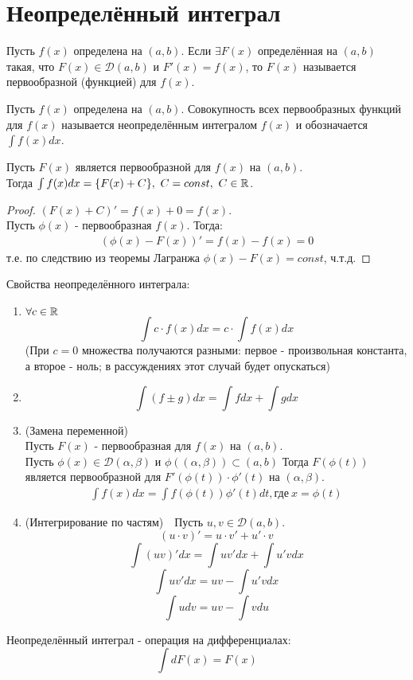 \section{Неопределённый интеграл}
\begin{definition}
    Пусть $f(x)$ определена на $(a, b)$. Если $\exists F(x)$ определённая на $(a, b)$ такая, что $F(x) \in \mathcal{D}(a, b)$ и $F'(x) = f(x)$, то $F(x)$ называется первообразной (функцией) для $f(x)$.
\end{definition}
\begin{definition}
    Пусть $f(x)$ определена на $(a, b)$. Совокупность всех первообразных функций для $f(x)$ называется неопределённым интегралом $f(x)$ и обозначается $\int f(x)dx$.
\end{definition}
\begin{theorem}
    Пусть $F(x)$ является первообразной для $f(x)$ на $(a, b)$. \\Тогда $\int f(x)dx = \{F(x) + C\},\ C = const, \ C\in\mathbb{R}$.
\end{theorem}
\begin{proof}
    $(F(x) + C)' = f(x) + 0 = f(x)$.\\
    Пусть $\phi(x)$ -  первообразная $f(x)$. Тогда:
    \begin{align*}
        (\phi(x) - F(x))' = f(x) - f(x) = 0
    \end{align*}
    т.е. по следствию из теоремы Лагранжа $\phi(x) - F(x) = const$, ч.т.д.
\end{proof}
Свойства неопределённого интеграла:
\begin{enumerate}
    \item $\forall c \in \mathbb{R}$ 
    \[\int c\cdot f(x)dx = c\cdot \int f(x)dx\]
    (При $c = 0$ множества получаются разными: первое - произвольная константа, а второе - ноль; в рассуждениях этот случай будет опускаться)
    \item \[\int (f \pm g)dx = \int f dx + \int g dx\]
    \item (Замена переменной)\\
    Пусть $F(x)$ - первообразная для $f(x)$ на $(a, b)$.\\
    Пусть $\phi(x) \in \mathcal{D}(\alpha, \beta)$ и $\phi((\alpha, \beta)) \subset (a, b)$
    Тогда $F(\phi(t))$ является первообразной для $F'(\phi(t))\cdot\phi'(t)$ на $(\alpha, \beta)$.
    \begin{align*}
        \int f(x) dx = \int f(\phi(t))\phi'(t) dt ,\text{где} \ x = \phi(t)
    \end{align*}
    \item (Интегрирование по частям)\ \ Пусть $u,v \in \mathcal{D}(a, b)$.
    \[(u\cdot v)' = u\cdot v' + u'\cdot v\]
    \[\int(uv)'dx = \int uv' dx + \int u'v dx\]
    \[\int uv' dx = uv - \int u'v dx\]
    \[\int udv = uv - \int vdu\]
\end{enumerate}
\begin{comm}
    Неопределённый интеграл - операция на дифференциалах: 
    \[\int dF(x) = F(x)\]
\end{comm}

